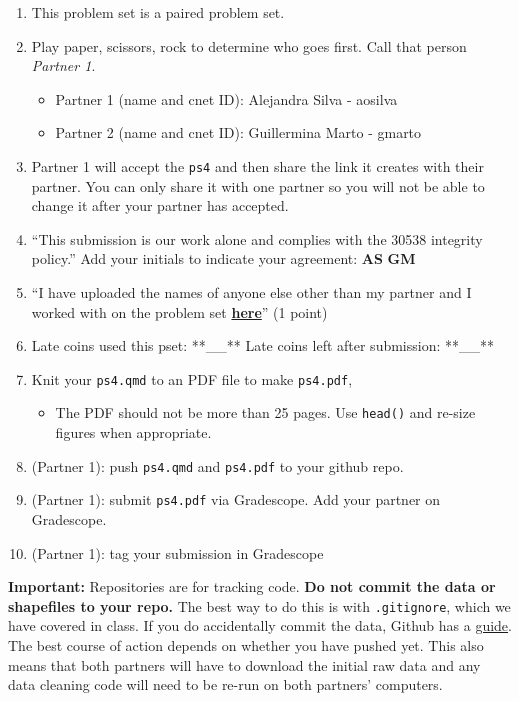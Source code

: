 \documentclass[
  letterpaper,
  DIV=11,
  numbers=noendperiod]{scrartcl}
\providecommand{\tightlist}{%
  \setlength{\itemsep}{0pt}\setlength{\parskip}{0pt}}\usepackage{longtable,booktabs,array}
\begin{document}
\begin{enumerate}
\def\labelenumi{\arabic{enumi}.}
\tightlist
\item
  This problem set is a paired problem set.
\item
  Play paper, scissors, rock to determine who goes first. Call that
  person \emph{Partner 1}.

  \begin{itemize}
  \tightlist
  \item
    Partner 1 (name and cnet ID): Alejandra Silva - aosilva
  \item
    Partner 2 (name and cnet ID): Guillermina Marto - gmarto
  \end{itemize}
\item
  Partner 1 will accept the \texttt{ps4} and then share the link it
  creates with their partner. You can only share it with one partner so
  you will not be able to change it after your partner has accepted.
\item
  ``This submission is our work alone and complies with the 30538
  integrity policy.'' Add your initials to indicate your agreement:
  \textbf{AS} \textbf{GM}
\item
  ``I have uploaded the names of anyone else other than my partner and I
  worked with on the problem set
  \textbf{\href{https://docs.google.com/forms/d/185usrCREQaUbvAXpWhChkjghdGgmAZXA3lPWpXLLsts/edit}{here}}''
  (1 point)
\item
  Late coins used this pset: **\_\_** Late coins left after submission:
  **\_\_**
\item
  Knit your \texttt{ps4.qmd} to an PDF file to make \texttt{ps4.pdf},

  \begin{itemize}
  \tightlist
  \item
    The PDF should not be more than 25 pages. Use \texttt{head()} and
    re-size figures when appropriate.
  \end{itemize}
\item
  (Partner 1): push \texttt{ps4.qmd} and \texttt{ps4.pdf} to your github
  repo.
\item
  (Partner 1): submit \texttt{ps4.pdf} via Gradescope. Add your partner
  on Gradescope.
\item
  (Partner 1): tag your submission in Gradescope
\end{enumerate}

\textbf{Important:} Repositories are for tracking code. \textbf{Do not
commit the data or shapefiles to your repo.} The best way to do this is
with \texttt{.gitignore}, which we have covered in class. If you do
accidentally commit the data, Github has a
\href{https://docs.github.com/en/repositories/working-with-files/managing-large-files/about-large-files-on-github\#removing-files-from-a-repositorys-history}{guide}.
The best course of action depends on whether you have pushed yet. This
also means that both partners will have to download the initial raw data
and any data cleaning code will need to be re-run on both partners'
computers.
\end{document}

